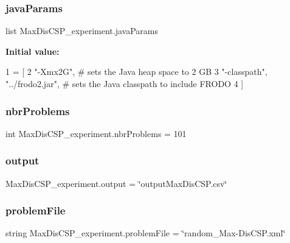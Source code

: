 \subsubsection{\texorpdfstring{java\+Params}{javaParams}}
{\footnotesize\ttfamily list Max\+Dis\+C\+S\+P\+\_\+experiment.\+java\+Params}

{\bfseries Initial value\+:}
\begin{DoxyCode}
1 =  [
2             \textcolor{stringliteral}{"-Xmx2G"}, \textcolor{comment}{# sets the Java heap space to 2 GB}
3             \textcolor{stringliteral}{"-classpath"}, \textcolor{stringliteral}{"../frodo2.jar"}, \textcolor{comment}{# sets the Java classpath to include FRODO}
4             ]
\end{DoxyCode}
\mbox{\label{namespaceMaxDisCSP__experiment_ab85d28864ad0510b5a36351bc144c387}} 
\subsubsection{\texorpdfstring{nbr\+Problems}{nbrProblems}}
{\footnotesize\ttfamily int Max\+Dis\+C\+S\+P\+\_\+experiment.\+nbr\+Problems = 101}

\mbox{\label{namespaceMaxDisCSP__experiment_a180221711d5ce1688f14955f0f9a2f5e}} 
\subsubsection{\texorpdfstring{output}{output}}
{\footnotesize\ttfamily Max\+Dis\+C\+S\+P\+\_\+experiment.\+output = \char`\"{}output\+Max\+Dis\+C\+S\+P.\+csv\char`\"{}}

\mbox{\label{namespaceMaxDisCSP__experiment_a33b70bc81f4d5bb7fa331364dbd3911c}} 
\subsubsection{\texorpdfstring{problem\+File}{problemFile}}
{\footnotesize\ttfamily string Max\+Dis\+C\+S\+P\+\_\+experiment.\+problem\+File = \char`\"{}random\+\_\+\+Max-\/Dis\+C\+S\+P.\+xml\char`\"{}}

